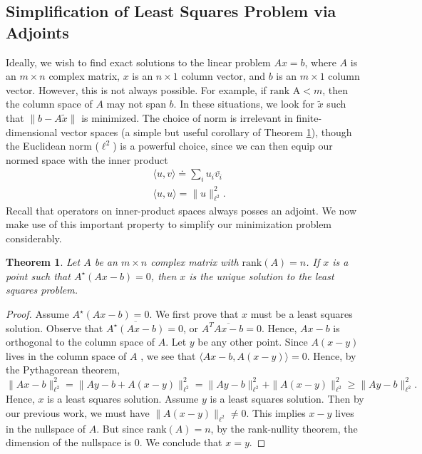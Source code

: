 \documentclass[12pt,reqno]{amsart}
\numberwithin{equation}{section}  %
\newtheorem{theorem}{Theorem}
\begin{document}
\subsection{Simplification of Least Squares Problem via Adjoints} 
Ideally, we wish to find exact solutions to the linear problem $Ax = b$, where
$A$ is an $m \times n$ complex matrix, $x$ is an $n \times 1$ column vector, and
$b$ is an $m \times 1$ column vector. However, this is not always possible. For
example, if $\text{rank A} < m$, then the column space of $A$ may not span $b$.
In these situations, we look for $\tilde{x}$ such that $ \| b - A\tilde{x}\|$ is
minimized. The choice of norm is irrelevant in finite-dimensional vector spaces (a
simple but useful corollary of Theorem \ref{thm:adj-ls}),
though the Euclidean norm ($\ell^2$) is a powerful choice, since we can then
equip our normed space with the inner product
\begin{equation*}
\begin{split}
& \langle u, v \rangle \doteq \sum_i u_i \bar{v_i}
\\
&  \langle u, u \rangle =\| u \|_{\ell^2}^2.
\end{split}
\end{equation*}
Recall that operators on inner-product spaces always posses an adjoint. We now
make use of this important property to simplify our minimization problem
considerably.
\begin{theorem}
\label{thm:adj-ls}
Let $A$ be an $m \times n$ complex matrix with $\text{rank}(A) = n$. 
If $x$ is a point such that $A^{\star} (Ax - b) = 0$, then $x$ is the unique solution 
to the least squares problem.
\end{theorem} 
\begin{proof}
Assume $A^{\star}(Ax-b) = 0$. We first prove that $x$ must be a least squares solution. Observe that
 $\overline{A^{\star}(Ax-b)} = 0$, or $A^T
\overline{Ax-b} = 0$. Hence, $Ax-b$ is orthogonal to the column space of $A$. 
Let $y$ be any other point. Since $A(x-y)$ lives in the column space of $A$
, we see that $\langle Ax-b, A(x-y) \rangle = 0$. Hence, by the Pythagorean theorem,
\begin{equation*}
\| Ax - b \|_{\ell^2}^2 = \| Ay - b + A(x-y)
\|_{\ell^2}^2 = \| Ay - b \|_{\ell^2}^2 + \| A(x-y) \|_{\ell^2}^2 \ge \| Ay - b
\|_{\ell^2}^2.
\end{equation*}
Hence, $x$ is a least squares solution. Assume $y$ is a least squares solution. Then by our previous work, 
we must have $ \| A(x - y) \|_{\ell^2} \neq 0$. This implies $x-y$ lives in the nullspace of $A$.
But since $\text{rank}(A) = n$, by the rank-nullity theorem, the dimension of the nullspace 
is $0$. We conclude that $x = y$. 
\end{proof}
\end{document}
